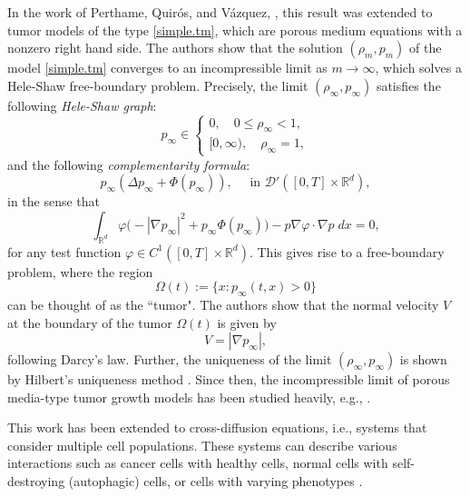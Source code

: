 \documentclass{amsart}
\def\R{\mathbb R}
\begin{document}
In the work of Perthame, Quir\'os, and V\'azquez, \cite{PerthameQuiros2014}, this result was extended to tumor models of the type \eqref{simple.tm}, which are porous medium equations with a nonzero right hand side. The authors show that the solution $(\rho_m,p_m)$ of the model \eqref{simple.tm} converges to an incompressible limit as $m \rightarrow \infty$, which solves a Hele-Shaw free-boundary problem. Precisely, the limit $(\rho_\infty,p_\infty)$  satisfies the following \textit{Hele-Shaw graph}:
\begin{equation}\label{hs1}
p_\infty \in
    \begin{cases}
        0, \quad 0\leq \rho_\infty <1, \\
        [0,\infty), \quad \rho_\infty =1,
    \end{cases}
\end{equation}
and the following \textit{complementarity formula}:
$$
p_\infty(\Delta p_\infty +\Phi(p_\infty)), \quad \text{ in } \mathcal{D}'([0,T]\times \R^d),
$$
in the sense that
\begin{equation*}
    \int_{\R^d}\varphi\bigl(-|\nabla p_\infty|^2+p_\infty \Phi(p_\infty)\bigr)-p\nabla \varphi \cdot \nabla p \; dx=0, 
\end{equation*}
for any test function $\varphi \in C^1([0,T]\times \R^d)$.
This gives rise to a free-boundary problem, where the region $$
\Omega(t):=\{x: p_\infty(t,x)>0\}$$ can be thought of as the ``tumor". The authors show that the normal velocity $V$ at the boundary of the tumor $\Omega(t)$ is given by 
$$
V=|\nabla p_\infty|,
$$
following Darcy's law. Further, the uniqueness of the limit $(\rho_\infty,p_\infty)$ is shown by Hilbert's uniqueness method \cite{Bnilan1982SolutionsOT,crowley}. Since then, the incompressible limit of porous media-type tumor growth models has been studied heavily, e.g., \cite{david2020freeboundarylimittumor,mellet2015heleshawproblemtumorgrowth,kim2022,Guillen_2022}.

This work has been extended to cross-diffusion equations, i.e., systems that consider multiple cell populations. These systems can describe various interactions such as cancer cells with healthy cells, normal cells with self-destroying (autophagic) cells, or cells with varying phenotypes \cite{BubbaPerthamePoucholSchmidtchen2020,david,liuxu,PriceXu2020}.
\end{document}
